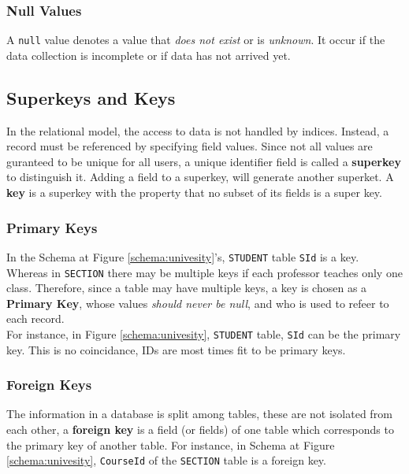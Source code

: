 \documentclass[11pt,a4paper,twocolumn]{book}
\begin{document}
\subsubsection{Null Values}

A \texttt{null} value denotes a value that \textit{does not exist} or is \textit{unknown}. It occur if the data collection is incomplete or if data has not arrived yet.

\subsection{Superkeys and Keys}

In the relational model, the access to data is not handled by indices. Instead, a record must be referenced by specifying field values. Since not all values are guranteed to be unique for all users, a unique identifier field is called a \textbf{superkey} to distinguish it. Adding a field to a superkey, will generate another superket. A \textbf{key} is a superkey with the property that no subset of its fields is a super key.\\

\subsubsection{Primary Keys}

In the Schema at Figure \ref{schema:univesity}'s, \texttt{STUDENT} table \texttt{SId} is a key. Whereas in \texttt{SECTION} there may be multiple keys if each professor teaches only one class. Therefore, since a table may have multiple keys, a key is chosen as a \textbf{Primary Key}, whose  values \textit{should never be null}, and who is used to refeer to each record.\\

For instance, in Figure \ref{schema:univesity}, \texttt{STUDENT} table, \texttt{SId} can be the primary key. This is no coincidance, IDs are most times fit to be primary keys.

\subsubsection{Foreign Keys}

The information in a database is split among tables, these are not isolated from each other, a \textbf{foreign key} is a field (or fields) of one table which corresponds to the primary key of another table. For instance, in Schema at Figure \ref{schema:univesity}, \texttt{CourseId} of the \texttt{SECTION} table is a foreign key.\\
\end{document}
